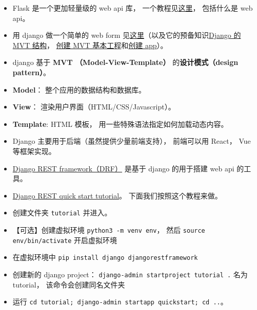 

\begin{issues}
\issueDraft
\end{issues}

\begin{itemize}
\item Flask 是一个更加轻量级的 web api 库， 一个教程见\href{https://programminghistorian.org/en/lessons/creating-apis-with-python-and-flask}{这里}， 包括什么是 web api。
\item 用 django 做一个简单的 web form 见\href{https://www.geeksforgeeks.org/how-to-create-a-form-using-django-forms/}{这里}（以及它的预备知识\href{https://www.geeksforgeeks.org/django-project-mvt-structure}{Django 的 MVT 结构}， \href{https://www.geeksforgeeks.org/how-to-create-a-basic-project-using-mvt-in-django/}{创建 MVT 基本工程}和\href{https://www.geeksforgeeks.org/how-to-create-an-app-in-django/}{创建 app}）。
\item django 基于 \textbf{MVT （Model-View-Template）} 的\textbf{设计模式（design pattern）}。
\item \textbf{Model}： 整个应用的数据结构和数据库。
\item \textbf{View}： 渲染用户界面（HTML/CSS/Javascript）。
\item \textbf{Template}: HTML 模板， 用一些特殊语法指定如何加载动态内容。
\item Django 主要用于后端（虽然提供少量前端支持）， 前端可以用 React， Vue 等框架实现。
\item \href{https://www.django-rest-framework.org/}{Django REST framework（DRF）} 是基于 django 的用于搭建 web api 的工具。
\item \href{https://www.django-rest-framework.org/tutorial/quickstart/}{Django REST quick start tutorial}。 下面我们按照这个教程来做。
\item 创建文件夹 \verb|tutorial| 并进入。
\item 【可选】创建虚拟环境 \verb|python3 -m venv env|， 然后 \verb|source env/bin/activate| 开启虚拟环境
\item 在虚拟环境中 \verb|pip install django djangorestframework|
\item 创建新的 django project： \verb|django-admin startproject tutorial .| 名为 tutorial， 该命令会创建同名文件夹
\item 运行 \verb|cd tutorial; django-admin startapp quickstart; cd ..|。
\begin{figure}[ht]

\end{figure}
\end{itemize}
